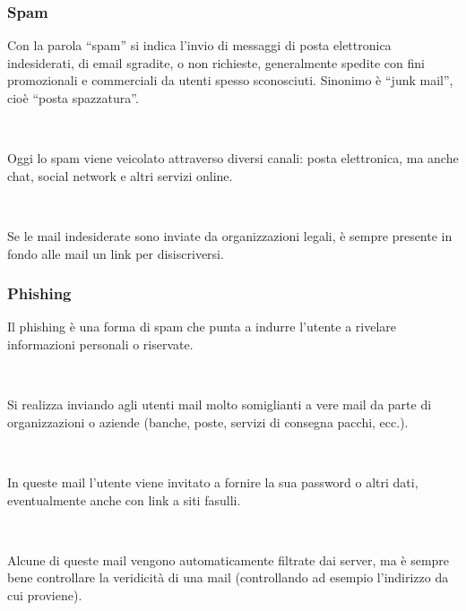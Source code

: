 \documentclass[]{beamer}
\begin{document}
\begin{frame}
\frametitle{Spam}
Con la parola ``spam'' si indica l’\alert<1>{invio di messaggi di posta elettronica indesiderati}, di email sgradite, o non richieste, generalmente spedite con fini promozionali e commerciali da utenti spesso sconosciuti. Sinonimo è ``junk mail'', cioè ``posta spazzatura''.\pause

~

Oggi lo spam viene veicolato attraverso diversi canali: posta elettronica, ma anche chat, social network e altri servizi online.\pause

~

Se le mail indesiderate sono inviate da organizzazioni legali, è sempre presente in fondo alle mail un \alert<3>{link per disiscriversi}.
\end{frame}



\begin{frame}
\frametitle{Phishing}
Il \alert<1>{phishing} è una forma di spam che punta a indurre l'utente a \alert<1>{rivelare informazioni personali o riservate}.\pause

~
  
Si realizza inviando agli utenti mail molto somiglianti a vere mail da parte di organizzazioni o aziende (banche, poste, servizi di consegna pacchi, ecc.).\pause

~

In queste mail l'utente viene invitato a fornire la sua password o altri dati, eventualmente anche con link a siti fasulli.\pause

~

Alcune di queste mail vengono automaticamente filtrate dai server, ma è sempre bene controllare la veridicità di una mail (controllando ad esempio l'indirizzo da cui proviene).
\end{frame}
\end{document}
